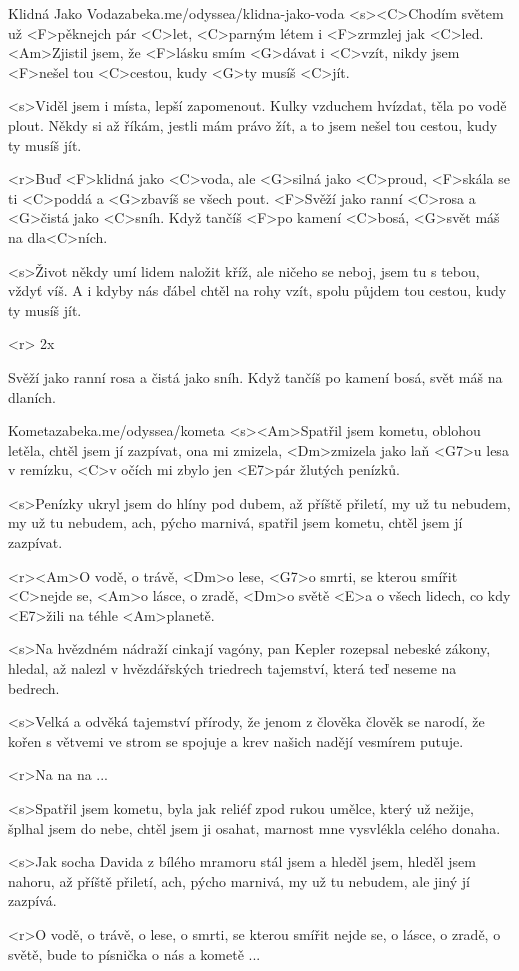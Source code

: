 \begin{song}[Jelen]{39}{Klidná Jako Voda}{zabeka.me/odyssea/klidna-jako-voda}
	<s><C>Chodím světem už <F>pěknejch pár <C>let,
	<C>parným létem i <F>zrmzlej jak <C>led.
	<Am>Zjistil jsem, že <F>lásku smím <G>dávat i <C>vzít,
	nikdy jsem <F>nešel tou <C>cestou, kudy <G>ty musíš <C>jít.

	<s>Viděl jsem i místa, lepší zapomenout.
	Kulky vzduchem hvízdat, těla po vodě plout.
	Někdy si až říkám, jestli mám právo žít,
	a to jsem nešel tou cestou, kudy ty musíš jít.

	<r>Buď <F>klidná jako <C>voda, ale <G>silná jako <C>proud,
	<F>skála se ti <C>poddá a <G>zbavíš se všech pout.
	<F>Svěží jako ranní <C>rosa a <G>čistá jako <C>sníh.
	Když tančíš <F>po kamení <C>bosá, <G>svět máš na dla<C>ních.

	<s>Život někdy umí lidem naložit kříž,
	ale ničeho se neboj, jsem tu s tebou, vždyť víš.
	A i kdyby nás ďábel chtěl na rohy vzít,
	spolu půjdem tou cestou, kudy ty musíš jít.

	<r>
	2x

	Svěží jako ranní rosa a čistá jako sníh.
	Když tančíš po kamení bosá, svět máš na dlaních.

\end{song}
\begin{song}{40}{Kometa}{zabeka.me/odyssea/kometa}
	<s><Am>Spatřil jsem kometu, oblohou letěla,
	chtěl jsem jí zazpívat, ona mi zmizela,
	<Dm>zmizela jako laň <G7>u lesa v remízku,
	<C>v očích mi zbylo jen <E7>pár žlutých penízků.

	<s>Penízky ukryl jsem do hlíny pod dubem,
	až příště přiletí, my už tu nebudem,
	my už tu nebudem, ach, pýcho marnivá,
	spatřil jsem kometu, chtěl jsem jí zazpívat.

	<r><Am>O vodě, o trávě, <Dm>o lese,
	<G7>o smrti, se kterou smířit <C>nejde se,
	<Am>o lásce, o zradě, <Dm>o světě
	<E>a o všech lidech, co kdy <E7>žili na téhle <Am>planetě.

	<s>Na hvězdném nádraží cinkají vagóny,
	pan Kepler rozepsal nebeské zákony,
	hledal, až nalezl v hvězdářských triedrech
	tajemství, která teď neseme na bedrech.

	<s>Velká a odvěká tajemství přírody,
	že jenom z člověka člověk se narodí,
	že kořen s větvemi ve strom se spojuje
	a krev našich nadějí vesmírem putuje.

	<r>Na na na ...

	<s>Spatřil jsem kometu, byla jak reliéf
	zpod rukou umělce, který už nežije,
	šplhal jsem do nebe, chtěl jsem ji osahat,
	marnost mne vysvlékla celého donaha.

	<s>Jak socha Davida z bílého mramoru
	stál jsem a hleděl jsem, hleděl jsem nahoru,
	až příště přiletí, ach, pýcho marnivá,
	my už tu nebudem, ale jiný jí zazpívá.

	<r>O vodě, o trávě, o lese,
	o smrti, se kterou smířit nejde se,
	o lásce, o zradě, o světě,
	bude to písnička o nás a kometě ...
\end{song}
